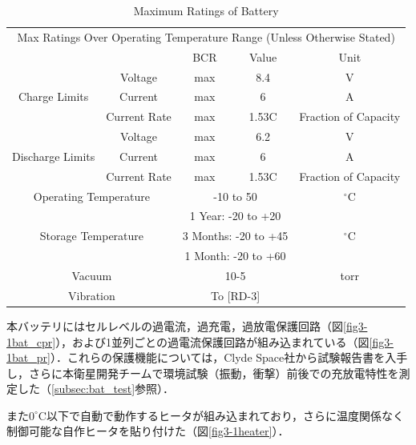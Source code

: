 \begin{table}
	\caption{Maximum Ratings of Battery \cite{bat_um}}
	\label{table3_1_bat_max}
	\centering
	\begin{tabular}{ccccc}
		\hline \hline
		\multicolumn{5}{c}{Max Ratings Over Operating Temperature Range (Unless Otherwise Stated)}\\
		&&BCR  & Value  &  Unit  \\
		\hline
		\multirow{3}{*}{Charge Limits}&Voltage&max&8.4&V\\
		&Current&max&6&A\\
		&Current Rate& max &1.53C &Fraction of Capacity\\
		\hline
		\multirow{3}{*}{Discharge Limits}&Voltage&max&6.2&V\\
		&Current&max&6&A\\
		&Current Rate& max &1.53C &Fraction of Capacity\\
		\hline
		\multicolumn{2}{c}{Operating Temperature}&\multicolumn{2}{c}{ -10 to 50} & ${}^\circ$C\\
		\multicolumn{2}{c}{\multirow{3}{*}{Storage Temperature}}&\multicolumn{2}{c}{1 Year: -20 to +20}&\multirow{3}{*}{${}^\circ$C}\\
		&&\multicolumn{2}{c}{3 Months: -20 to +45}&\\
		&&\multicolumn{2}{c}{1 Month: -20 to +60}&\\
		\multicolumn{2}{c}{Vacuum}&\multicolumn{2}{c}{10-5}&torr\\
		\multicolumn{2}{c}{Vibration}&\multicolumn{2}{c}{To [RD-3]}\\
		\hline
	\end{tabular}
\end{table}
	
本バッテリにはセルレベルの過電流，過充電，過放電保護回路（図\ref{fig3-1bat_cpr}），および1並列ごとの過電流保護回路が組み込まれている（図\ref{fig3-1bat_pr}）．これらの保護機能については，Clyde Space社から試験報告書を入手し，さらに本衛星開発チームで環境試験（振動，衝撃）前後での充放電特性を測定した（\ref{subsec:bat_test}参照）．

また$0^\circ$C以下で自動で動作するヒータが組み込まれており，さらに温度関係なく制御可能な自作ヒータを貼り付けた（図\ref{fig3-1heater}）．

